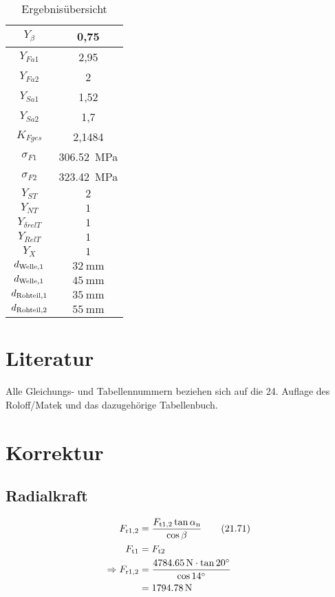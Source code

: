 \documentclass[15pt,a4paper]{article}
\begin{document}
\begin{table}[!hbpt]
\begin{tabular}{c|c}
     		$Y_\beta$ & 0,75 \\\hline
     		$Y_{Fa1}$ & 2,95 \\\hline
     		$Y_{Fa2}$ &  2\\\hline
     		$Y_{Sa1}$ & 1,52 \\\hline
     		$Y_{Sa2}$ & 1,7 \\\hline
     		$ K_{Fges} $ &  2,1484\\\hline
     		$ \sigma_{F1}$& \SI{306,52}{\mega\pascal}\\\hline
     		$ \sigma_{F2} $&\SI{323,42}{\mega\pascal}\\\hline
     		$Y_{ST}$&$2 $\\\hline
     		$Y_{NT}$&$1 $\\\hline
     		$Y_{\delta rel T}$&$1 $\\\hline
     		$Y_{RelT}$&$1 $\\\hline
     		$Y_X$&$1$\\\hline
     		$d_{\rm Welle, 1}$&$\SI{32}{\milli\m} $\\\hline
     		$d_{\rm Welle, 1}$&$\SI{45}{\milli\m}$\\\hline
     		$d_{\rm Rohteil, 1} $&$ \SI{35}{\milli\m}$\\\hline
     		$d_{\rm Rohteil, 2} $&$ \SI{55}{\milli\m}$\\\hline
     	\end{tabular}
     	\caption{Ergebnisübersicht}
     	\label{Ergebnisse}
     \end{table}
 	\section{Literatur}
 	Alle Gleichungs- und Tabellennummern beziehen sich auf die 24. Auflage des Roloff/Matek und das dazugehörige Tabellenbuch.
 	
 	\section{Korrektur}
 		\subsection{Radialkraft}
 			\begin{align*}
 				F_{\rm r 1,2} &= \frac{F_{\rm t1,2} \tan \alpha_{\rm n}}{\cos \beta}\tag{21.71}\\
 				F_{\rm t1}&= F_{\rm t2}\\
 				\Rightarrow F_{\rm r 1,2} &= \frac{\SI{4784,65}{\newton} \cdot \tan \ang{20}}{\cos \ang{14}}\\
 				&= \SI{1794,78}{\newton}
 			\end{align*}
\end{document}
